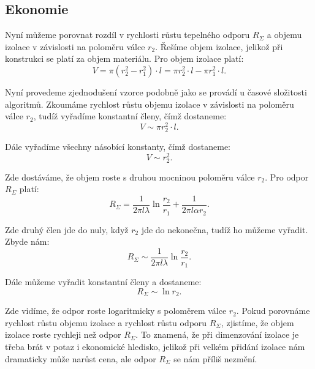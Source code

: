 \documentclass{article}
\begin{document}
\subsection{Ekonomie}

Nyní můžeme porovnat rozdíl v rychlosti růstu tepelného odporu $R_{\Sigma}$ a objemu izolace v závislosti na poloměru válce $r_2$. Řešíme objem izolace, jelikož při konstrukci se platí za objem materiálu. Pro objem izolace platí:
$$
    V = \pi (r_2^2 - r_1^2) \cdot l = \pi r_2^2 \cdot l - \pi r_1^2 \cdot l.
$$

Nyní provedeme zjednodušení vzorce podobně jako se provádí u časové složitosti algoritmů. Zkoumáme rychlost růstu objemu izolace v závislosti na poloměru válce $r_2$, tudíž vyřadíme konstantní členy, čímž dostaneme:
$$
    V \sim \pi r_2^2 \cdot l.
$$

Dále vyřadíme všechny násobící konstanty, čímž dostaneme:
$$
    V \sim r_2^2.
$$

Zde dostáváme, že objem roste s druhou mocninou poloměru válce $r_2$. Pro odpor $R_{\Sigma}$ platí:
$$
    R_{\Sigma} = \frac{1}{2 \pi l \lambda} \ln \frac{r_2}{r_1} + \frac{1}{2 \pi l \alpha r_2}.
$$

Zde druhý člen jde do nuly, když $r_2$ jde do nekonečna, tudíž ho můžeme vyřadit. Zbyde nám:
$$
    R_{\Sigma} \sim \frac{1}{2 \pi l \lambda} \ln \frac{r_2}{r_1}.
$$

Dále můžeme vyřadit konstantní členy a dostaneme:
$$
    R_{\Sigma} \sim \ln r_2.
$$

Zde vidíme, že odpor roste logaritmicky s poloměrem válce $r_2$. Pokud porovnáme rychlost růstu objemu izolace a rychlost růstu odporu $R_{\Sigma}$, zjistíme, že objem izolace roste rychleji než odpor $R_{\Sigma}$. To znamená, že při dimenzování izolace je třeba brát v potaz i ekonomické hledisko, jelikož při velkém přidání izolace nám dramaticky může narůst cena, ale odpor $R_{\Sigma}$ se nám příliš nezmění.

\begin{center}
\end{center}
\end{document}
